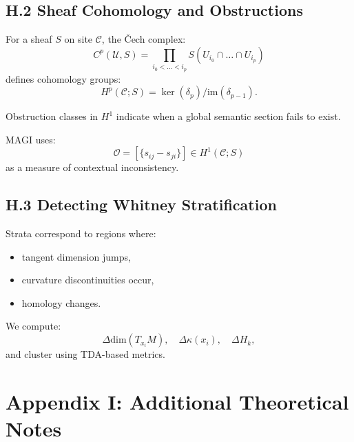\documentclass[11pt,a4paper,twocolumn]{article}
\begin{document}

\subsection*{H.2 Sheaf Cohomology and Obstructions}

For a sheaf $S$ on site $\mathcal{C}$, the Čech complex:
\[
C^p(\mathcal{U}, S) =
\prod_{i_0 < \dots < i_p}
S(U_{i_0} \cap \dots \cap U_{i_p})
\]
defines cohomology groups:
\[
H^p(\mathcal{C};S)
= \ker(\delta_p) / \mathrm{im}(\delta_{p-1}).
\]

Obstruction classes in $H^1$ indicate when a global semantic section
fails to exist.

MAGI uses:
\[
\mathcal{O} =
[\{ s_{ij} - s_{ji} \}] \in H^1(\mathcal{C};S)
\]
as a measure of contextual inconsistency.


\subsection*{H.3 Detecting Whitney Stratification}

Strata correspond to regions where:
\begin{itemize}
\item tangent dimension jumps,
\item curvature discontinuities occur,
\item homology changes.
\end{itemize}

We compute:
\[
\Delta \mathrm{dim}(T_{x_i}M),\quad
\Delta \kappa(x_i),\quad
\Delta H_k,
\]
and cluster using TDA-based metrics.


\section*{Appendix I: Additional Theoretical Notes}
\end{document}
